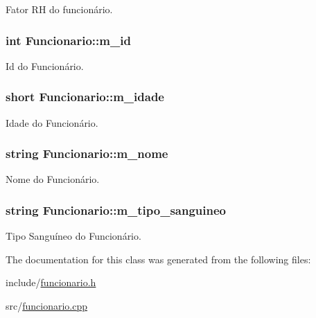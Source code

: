 Fator RH do funcionário. 

\subsubsection[{\texorpdfstring{m\+\_\+id}{m_id}}]{\setlength{\rightskip}{0pt plus 5cm}int Funcionario\+::m\+\_\+id\hspace{0.3cm}{\ttfamily [protected]}}\hypertarget{classFuncionario_a123c4af00e4e6eea5d4d9366a8bfefed}{}\label{classFuncionario_a123c4af00e4e6eea5d4d9366a8bfefed}


Id do Funcionário. 

\subsubsection[{\texorpdfstring{m\+\_\+idade}{m_idade}}]{\setlength{\rightskip}{0pt plus 5cm}short Funcionario\+::m\+\_\+idade\hspace{0.3cm}{\ttfamily [protected]}}\hypertarget{classFuncionario_a2bc5a68aebcf1a792812430ce5c8bdca}{}\label{classFuncionario_a2bc5a68aebcf1a792812430ce5c8bdca}


Idade do Funcionário. 

\subsubsection[{\texorpdfstring{m\+\_\+nome}{m_nome}}]{\setlength{\rightskip}{0pt plus 5cm}string Funcionario\+::m\+\_\+nome\hspace{0.3cm}{\ttfamily [protected]}}\hypertarget{classFuncionario_a09663cf1395c066ef8cd538ead0f1a10}{}\label{classFuncionario_a09663cf1395c066ef8cd538ead0f1a10}


Nome do Funcionário. 

\subsubsection[{\texorpdfstring{m\+\_\+tipo\+\_\+sanguineo}{m_tipo_sanguineo}}]{\setlength{\rightskip}{0pt plus 5cm}string Funcionario\+::m\+\_\+tipo\+\_\+sanguineo\hspace{0.3cm}{\ttfamily [protected]}}\hypertarget{classFuncionario_a89037092e620b92e1e8e305de50cb2d9}{}\label{classFuncionario_a89037092e620b92e1e8e305de50cb2d9}


Tipo Sanguíneo do Funcionário. 



The documentation for this class was generated from the following files\+:\begin{DoxyCompactItemize}
\item 
include/\hyperlink{funcionario_8h}{funcionario.\+h}\item 
src/\hyperlink{funcionario_8cpp}{funcionario.\+cpp}\end{DoxyCompactItemize}
